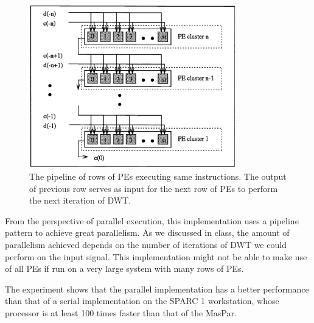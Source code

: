 \begin{figure}
    \centering
    \includegraphics[width=0.8\textwidth]{fig/simd2.png}
    \caption{The pipeline of rows of PEs executing same instructions.
             The output of previous row serves as input for the next row
             of PEs to perform the next iteration of DWT.}
    \label{fig:simd2}
\end{figure}


From the perspective of parallel execution, this implementation uses
a pipeline pattern to achieve great parallelism.
%
As we discussed in class, the amount of parallelism achieved depends on
the number of iterations of DWT we could perform on the input signal.
%
This implementation might not be able to make use of all PEs if run on 
a very large system with many rows of PEs.


The experiment shows that the parallel implementation has a better 
performance than that of a serial implementation on the SPARC 1 workstation,
whose processor is at least 100 times faster than that of the MasPar.

